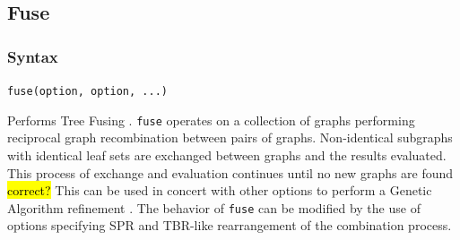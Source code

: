 \subsection{Fuse}
	\subsubsection{Syntax}
		\texttt{fuse(option, option, ...)}
		
	\begin{phygdescription}
		{Performs Tree Fusing \citep{goloboff1999, moilanen1999, moilanen2001}. \texttt{fuse} 
		operates on a collection of graphs performing reciprocal graph recombination between 
		pairs of graphs. Non-identical subgraphs with identical leaf sets are exchanged between 
		graphs and the 	results evaluated. This process of exchange and evaluation continues 
		until no new graphs are found \hl{correct?} 
		This can be used in concert with other options to perform a Genetic Algorithm refinement
		\citep{Holland1975}. The behavior of \texttt{fuse} can be modified by the use of options 
		specifying SPR and TBR-like rearrangement of the combination process.}
	\end{phygdescription}
	
